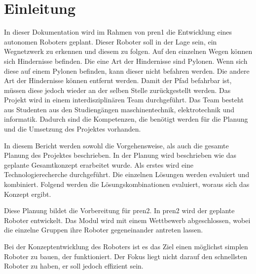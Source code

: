 \section{Einleitung}

In dieser Dokumentation wird im Rahmen von \acrfull{pren1} die Entwicklung eines autonomen Roboters geplant. Dieser Roboter soll in der Lage sein, ein Wegnetzwerk zu erkennen und diesem zu folgen. Auf den einzelnen Wegen können sich Hindernisse befinden. Die eine Art der Hindernisse sind Pylonen. Wenn sich diese auf einem Pylonen befinden, kann dieser nicht befahren werden. Die andere Art der Hindernisse können entfernt werden. Damit der Pfad befahrbar ist, müssen diese jedoch wieder an der selben Stelle zurückgestellt werden.
Das Projekt wird in einem interdisziplinären Team durchgeführt. Das Team besteht aus Studenten aus den Studiengängen \acrfull{maschinentechnik}, \acrfull{elektrotechnik} und \acrfull{informatik}. Dadurch sind die Kompetenzen, die benötigt werden für die Planung und die Umsetzung des Projektes vorhanden.

In diesem Bericht werden sowohl die Vorgehensweise, als auch die gesamte Planung des Projektes beschrieben. In der Planung wird beschrieben wie das geplante Gesamtkonzept erarbeitet wurde. Als erstes wird eine Technologierecherche durchgeführt. Die einzelnen Lösungen werden evaluiert und kombiniert. Folgend werden die Lösungskombinationen evaluiert, woraus sich das Konzept ergibt.

Diese Planung bildet die Vorbereitung für \acrfull{pren2}. In \acrshort{pren2} wird der geplante Roboter entwickelt. Das Modul wird mit einem Wettbewerb abgeschlossen, wobei die einzelne Gruppen ihre Roboter gegeneinander antreten lassen.

Bei der Konzeptentwicklung des Roboters ist es das Ziel einen möglichst simplen Roboter zu bauen, der funktioniert. Der Fokus liegt nicht darauf den schnellsten Roboter zu haben, er soll jedoch effizient sein.